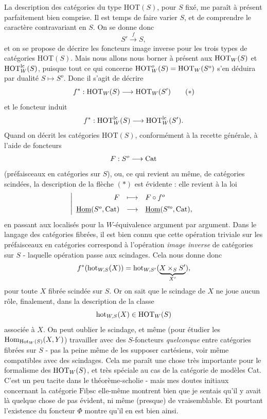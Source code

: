 La description des catégories du type HOT$(S)$, pour $S$ fixé, me paraît à présent parfaitement bien comprise. Il est temps de faire varier $S$, et de comprendre le caractère contravariant en $S$. On se donne donc
\[S' \xrightarrow{f} S,\]
et on se propose de décrire les foncteurs image inverse pour les trois types de catégories HOT$(S)$. Mais nous allons nous borner à présent aux $\mathrm{HOT}_W(S)$ et $\mathrm{HOT}^{\mathrm{lc}}_W(S)$, puisque tout ce qui concerne $\mathrm{HOT}^o_W(S) = \mathrm{HOT}_W(S^o)$ s'en déduira par dualité $S \longmapsto S^o$. Donc il s'agit de décrire
\[f^* : \mathrm{HOT}_W(S) \longrightarrow \mathrm{HOT}_W(S') \tag*{$(*)$}\]
et le foncteur induit
\[f^* : \mathrm{HOT}^{\mathrm{lc}}_W(S) \longrightarrow \mathrm{HOT}^{\mathrm{lc}}_W(S').\]
Quand on décrit les catégories HOT$(S)$, conformément à la recette générale, à l'aide de foncteurs
\[F : S^o \longrightarrow \mathrm{Cat}\]
(préfaisceaux en catégories sur $S$), ou, ce qui revient au même, de catégories scindées, la description de la flèche $(*)$ est évidente : elle revient à la loi
\[\left|\begin{array}{rcl}
F & \longmapsto & F \circ f^o \\[1ex]
\underline{\mathrm{Hom}}(S^o, \mathrm{Cat}) & \longrightarrow & \underline{\mathrm{Hom}}(S'^o, \mathrm{Cat}),
\end{array}\right.\]
en passant aux localisés pour la $W$-équivalence argument par argument. Dans le langage des catégories fibrées, il est bien connu que cette opération triviale sur les préfaisceaux en catégories correspond à l'opération \textit{image inverse} de catégories sur $S$ - laquelle opération passe aux scindages. Cela nous donne donc
\[f^*(\mathrm{hot}_{W,S}(X)) = \mathrm{hot}_{W,S'}(\underbrace{X \times_S S'}_{X'}),\]
pour toute $X$ fibrée scindée sur $S$. Or on sait que le scindage de $X$ ne joue aucun rôle, finalement, dans la description de la classe
\[\mathrm{hot}_{W,S}(X) \in \mathrm{HOT}_W(S)\]
associée à $X$. On peut oublier le scindage, et même (pour étudier les $\operatorname{Hom}_{\mathrm{Hot}_W(S)}(X, Y)$) travailler avec des $S$-foncteurs \textit{quelconque} entre catégories fibrées sur $S$ - pas la peine même de les supposer cartésiens, voir même compatibles avec des scindages. Cela me paraît une chose très importante pour le formalisme des $\mathrm{HOT}_W(S)$, et très spéciale au cas de la catégorie de modèles Cat. C'est un peu tacite dans le théorème-scholie - mais mes doutes initiaux concernant la catégorie $\underline{\mathrm{Fibsc}}$ elle-même montrent bien que je sentais qu'il y avait là quelque chose de pas évident, ni même (presque) de vraisemblable. Et pourtant l'existence du foncteur $\Phi$ montre qu'il en est bien ainsi.

